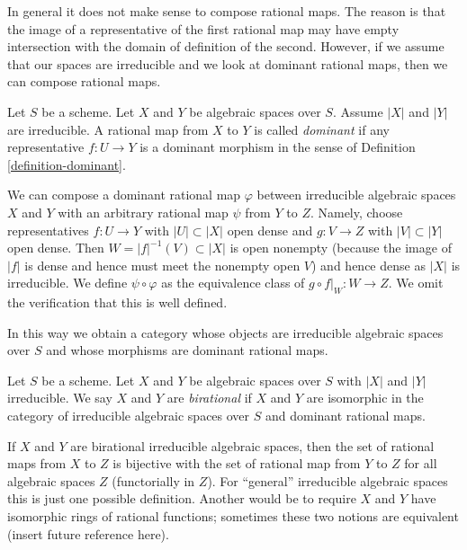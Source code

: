 \noindent
In general it does not make sense to compose rational maps. The reason
is that the image of a representative of the first rational map may
have empty intersection with the domain of definition of the second.
However, if we assume that our spaces are irreducible and we look
at dominant rational maps, then we can compose rational maps.

\begin{definition}
\label{definition-dominant-rational}
Let $S$ be a scheme. Let $X$ and $Y$ be algebraic spaces over $S$.
Assume $|X|$ and $|Y|$ are irreducible. A rational map from $X$ to $Y$
is called {\it dominant} if any representative $f : U \to Y$ is a dominant
morphism in the sense of Definition \ref{definition-dominant}.
\end{definition}

\noindent
We can compose a dominant rational map
$\varphi$ between irreducible algebraic spaces
$X$ and $Y$ with an arbitrary rational
map $\psi$ from $Y$ to $Z$. Namely, choose
representatives $f : U \to Y$ with $|U| \subset |X|$ open dense
and $g : V \to Z$ with $|V| \subset |Y|$ open dense. Then
$W = |f|^{-1}(V) \subset |X|$ is open nonempty (because
the image of $|f|$ is dense and hence must meet the nonempty open $V$)
and hence dense as $|X|$ is irreducible. We define $\psi \circ \varphi$
as the equivalence class of $g \circ f|_W : W \to Z$. We omit the verification
that this is well defined.

\medskip\noindent
In this way we obtain a category whose objects are irreducible algebraic
spaces over $S$ and whose morphisms are dominant rational maps.

\begin{definition}
\label{definition-birational-spaces}
Let $S$ be a scheme. Let $X$ and $Y$ be algebraic spaces
over $S$ with $|X|$ and $|Y|$ irreducible.
We say $X$ and $Y$ are {\it birational} if $X$ and $Y$ are isomorphic
in the category of irreducible algebraic spaces over $S$
and dominant rational maps.
\end{definition}

\noindent
If $X$ and $Y$ are birational irreducible algebraic spaces,
then the set of rational maps from $X$ to $Z$ is bijective
with the set of rational map from $Y$ to $Z$ for all algebraic
spaces $Z$ (functorially in $Z$). For ``general'' irreducible algebraic spaces
this is just one possible definition. Another would be
to require $X$ and $Y$ have isomorphic rings of
rational functions; sometimes these two notions are equivalent
(insert future reference here).

